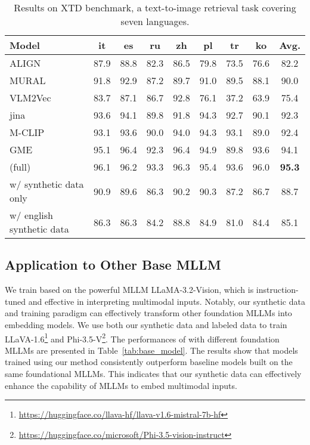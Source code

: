 \begin{table}[!tbp]
\centering
\scriptsize
\setlength{\tabcolsep}{2pt}
\begin{tabular}{l|cccccccc}
\toprule
Model          & it   & es   & ru   & zh   & pl   & tr   & ko   & Avg. \\
\midrule
ALIGN~\cite{ALIGN}           & 87.9 & 88.8 & 82.3 & 86.5 & 79.8 & 73.5 & 76.6 & 82.2 \\
MURAL~\cite{mural}           & 91.8 & 92.9 & 87.2 & 89.7 & 91.0 & 89.5 & 88.1 & 90.0 \\
VLM2Vec~\cite{MMEB} & 83.7 & 87.1 & 86.7 & 92.8 & 76.1 & 37.2 & 63.9 & 75.4 \\
jina~\cite{jina-clip}    & 93.6 & 94.1 & 89.8 & 91.8 & 94.3 & 92.7 & 90.1 & 92.3 \\
M-CLIP~\cite{mclip}  & 93.1 & 93.6 & 90.0 & 94.0 & 94.3 & 93.1 & 89.0 & 92.4 \\
GME~\cite{GME}             & 95.1 & 96.4 & 92.3 & 96.4 & 94.9 & 89.8 & 93.6 & 94.1 \\
\midrule
\ours{} (full) & 96.1 & 96.2 & 93.3 & 96.3 & 95.4 & 93.6 & 96.0 & \textbf{95.3} \\
\quad w/ synthetic data only & 90.9 & 89.6 & 86.3 & 90.2 & 90.3 & 87.2 & 86.7 & 88.7 \\
\quad w/ english synthetic data & 86.3 & 86.3 & 84.2 & 88.8 & 84.9 & 81.0 & 84.4 & 85.1 \\
\bottomrule
\end{tabular}
\caption{Results on XTD benchmark, a text-to-image retrieval task covering seven languages.
}
\label{tab:xtd}
\end{table}

\subsection{Application to Other Base MLLM}


We train \ours{} based on the powerful MLLM LLaMA-3.2-Vision, which is instruction-tuned and effective in interpreting multimodal inputs.
Notably, our synthetic data and training paradigm can effectively transform other foundation MLLMs into embedding models.
We use both our synthetic data and labeled data to train LLaVA-1.6\footnote{\url{https://huggingface.co/llava-hf/llava-v1.6-mistral-7b-hf}} and Phi-3.5-V\footnote{\url{https://huggingface.co/microsoft/Phi-3.5-vision-instruct}}.
The performances of \ours{} with different foundation MLLMs are presented in Table~\ref{tab:base_model}.
The results show that models trained using our method consistently outperform baseline models built on the same foundational MLLMs.
This indicates that our synthetic data can effectively enhance the capability of MLLMs to embed multimodal inputs.

